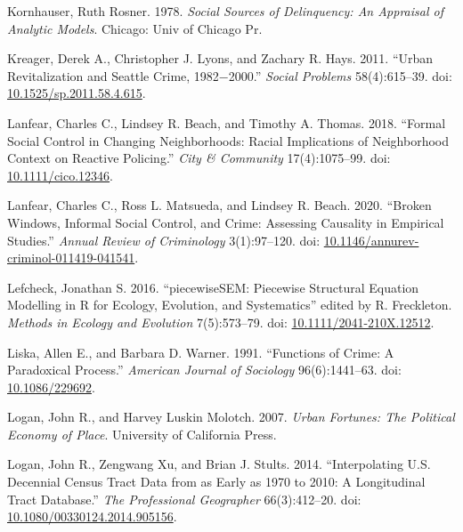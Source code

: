 \documentclass [11pt, proquest] {uwthesis}[2015/03/03]
\newlength{\cslhangindent}
\newenvironment{CSLReferences}[2]%
{\setlength{\parindent}{0pt}%
\everypar{\setlength{\hangindent}{\cslhangindent}}\ignorespaces}%
{\par}
\begin{document}
\begin{CSLReferences}{1}{0}
\leavevmode\hypertarget{ref-kornhauserSocialSourcesDelinquency1978}{}%
Kornhauser, Ruth Rosner. 1978. \emph{Social {Sources} of {Delinquency}: {An Appraisal} of {Analytic Models}}. {Chicago}: {Univ of Chicago Pr}.

\leavevmode\hypertarget{ref-kreagerUrbanRevitalizationSeattle2011a}{}%
Kreager, Derek A., Christopher J. Lyons, and Zachary R. Hays. 2011. {``Urban {Revitalization} and {Seattle Crime}, 1982−2000.''} \emph{Social Problems} 58(4):615--39. doi: \href{https://doi.org/10.1525/sp.2011.58.4.615}{10.1525/sp.2011.58.4.615}.

\leavevmode\hypertarget{ref-lanfearFormalSocialControl2018a}{}%
Lanfear, Charles C., Lindsey R. Beach, and Timothy A. Thomas. 2018. {``Formal {Social Control} in {Changing Neighborhoods}: {Racial Implications} of {Neighborhood Context} on {Reactive Policing}.''} \emph{City \& Community} 17(4):1075--99. doi: \href{https://doi.org/10.1111/cico.12346}{10.1111/cico.12346}.

\leavevmode\hypertarget{ref-lanfearBrokenWindowsInformal2020}{}%
Lanfear, Charles C., Ross L. Matsueda, and Lindsey R. Beach. 2020. {``Broken {Windows}, {Informal Social Control}, and {Crime}: {Assessing Causality} in {Empirical Studies}.''} \emph{Annual Review of Criminology} 3(1):97--120. doi: \href{https://doi.org/10.1146/annurev-criminol-011419-041541}{10.1146/annurev-criminol-011419-041541}.

\leavevmode\hypertarget{ref-lefcheckPiecewiseSEMPiecewiseStructural2016}{}%
Lefcheck, Jonathan S. 2016. {``{piecewiseSEM}: {Piecewise} Structural Equation Modelling in {R} for Ecology, Evolution, and Systematics''} edited by R. Freckleton. \emph{Methods in Ecology and Evolution} 7(5):573--79. doi: \href{https://doi.org/10.1111/2041-210X.12512}{10.1111/2041-210X.12512}.

\leavevmode\hypertarget{ref-liskaFunctionsCrimeParadoxical1991}{}%
Liska, Allen E., and Barbara D. Warner. 1991. {``Functions of {Crime}: {A Paradoxical Process}.''} \emph{American Journal of Sociology} 96(6):1441--63. doi: \href{https://doi.org/10.1086/229692}{10.1086/229692}.

\leavevmode\hypertarget{ref-loganUrbanFortunesPolitical2007}{}%
Logan, John R., and Harvey Luskin Molotch. 2007. \emph{Urban {Fortunes}: {The Political Economy} of {Place}}. {University of California Press}.

\leavevmode\hypertarget{ref-loganInterpolatingDecennialCensus2014}{}%
Logan, John R., Zengwang Xu, and Brian J. Stults. 2014. {``Interpolating {U}.{S}. {Decennial Census Tract Data} from as {Early} as 1970 to 2010: {A Longitudinal Tract Database}.''} \emph{The Professional Geographer} 66(3):412--20. doi: \href{https://doi.org/10.1080/00330124.2014.905156}{10.1080/00330124.2014.905156}.


\end{CSLReferences}
\end{document}

